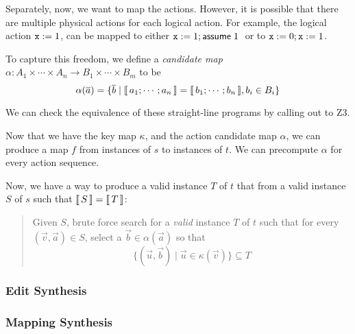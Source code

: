 Separately, now, we want to map the actions. However, it is possible
that there are multiple physical actions for each logical action. For
example, the logical action $\texttt{x}:=1$, can be mapped to either
$\texttt{x} := 1; \mathsf{assume}\; 1\;$ or to $\texttt{x}:= 0; \texttt{x}:= 1$.

To capture this freedom, we define a \emph{candidate map}
$\alpha : A_1 \times \cdots \times A_n \to B_1 \times \cdots \times
B_m$ to be
\[\alpha(\overline{a}) = \{\overline{b} \mid \llbracket\,a_1;\cdots;a_n\,\rrbracket =
  \llbracket\,b_1; \cdots; b_n\,\rrbracket, b_i \in B_i  \}\]

We can check the equivalence of these straight-line programs by
calling out to Z3.     

Now that we have the key map $\kappa$, and the action candidate map
$\alpha$, we can produce a map $f$ from instances of $s$ to instances
of $t$. We can precompute $\alpha$ for every action sequence.

Now, we have a way to produce a valid instance $T$ of $t$ that from a
valid instance $S$ of $s$ such that $\llbracket\,S\,\rrbracket = \llbracket\,T\,\rrbracket$:
\begin{quote}
  Given $S$, brute force search for a \emph{valid} instance $T$ of $t$
  such that for every $(\vec v, \vec a) \in S$, select a
  $\vec b \in \alpha(\vec a)$ so that
  \[\{(\vec u, \vec b) \mid \vec u \in
    \kappa(\vec v)\} \subseteq T\]
\end{quote}


\subsubsection{Edit Synthesis}


\subsubsection{Mapping Synthesis}


